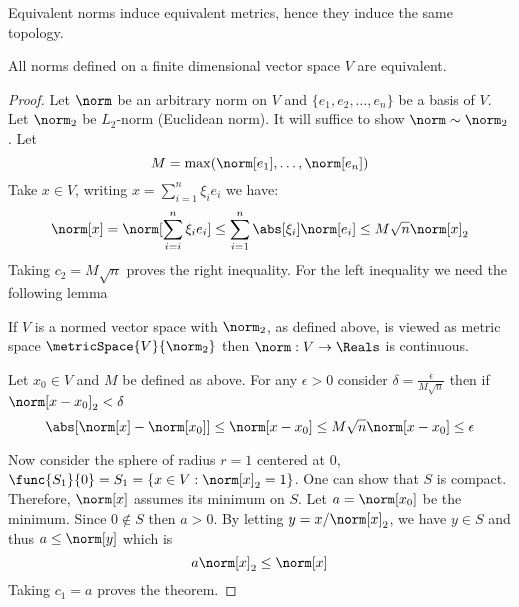 \begin{remark}
    Equivalent norms induce equivalent metrics, hence they induce the same topology.
\end{remark}

\begin{theorem} \label{th:normsEquivalent}
    All norms defined on a finite dimensional vector space \(V\) are equivalent.
\end{theorem}

\begin{proof}
    Let \(\norm\) be an arbitrary norm on \(V\) and \(\{e_1, e_2, \dots , e_n\} \) be a basis of \(V\). Let \(\norm_2\) be \(L_2\)-norm (Euclidean norm). It will suffice to show \(\norm \sim \norm_2\). Let
    \begin{equation*}
        M = \max \! \left( \norm[e_1], \dots , \norm[e_n] \right)
    \end{equation*}
    Take \(x \in V\), writing \(x = \sum_{i = 1}^n {\xi_i e_i}\) we have:
    \begin{equation*}
        \norm[x] = \norm[\sum_{i = i}^n {\xi_i e_i}] \leq \sum_{i = 1}^n \abs[\xi_i] \norm[e_i] \leq M \sqrt{n} \norm[x]_2
    \end{equation*}
    Taking \(c_2 = M \sqrt{n}\) proves the right inequality. For the left inequality we need the following lemma
    \begin{lemma} \label{lm:ContinuityOfNorm}
        If \(V\) is a normed vector space with \(\norm_2\), as defined above, is viewed as metric space \(\metricSpace{V}{\norm_2}\) then \(\norm : V \to \Reals\) is continuous.
    \end{lemma}

    \begin{prooflemma}
        Let \(x_0 \in V\) and \(M\) be defined as above. For any \(\epsilon > 0\) consider \(\delta = \frac{\epsilon}{M \sqrt{n}}\) then if \(\norm[x - x_0]_2 < \delta\)
        \begin{equation*}
            \abs[{\norm[x] - \norm[x_0]}] \leq \norm[x - x_0] \leq M \sqrt{n} \norm[x - x_0] \leq \epsilon
        \end{equation*}
    \end{prooflemma}

    Now consider the sphere of radius \(r = 1\) centered at \(0\), \(\func{S_1}{0} = S_1 = \{x \in V : \norm[x]_2 = 1\}\). One can show that \(S\) is compact. Therefore, \(\norm[x]\) assumes its minimum on \(S\). Let \( a = \norm[x_0]\) be the minimum. Since \(0 \notin S\) then \(a > 0\). By letting \(y = x / \norm[x]_2 \), we have \(y \in S\) and thus \(a \leq \norm[y]\) which is
    \begin{equation*}
        a \norm[x]_2 \leq \norm[x]
    \end{equation*}
    Taking \(c_1 = a\) proves the theorem.
\end{proof}


